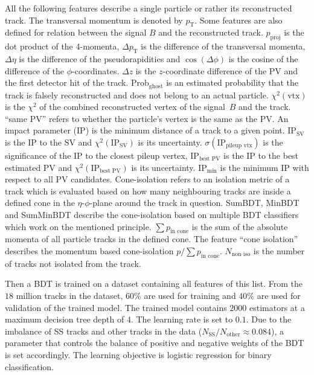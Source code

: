 All the following features describe a single particle or rather its reconstructed track.
%
The transversal momentum is denoted by $p_\text{T}$. 
%
Some features are also defined for relation between the signal $B$ and the reconstructed track. 
$p_\text{proj}$ is the dot product of the 4-momenta,
$\Delta p_\text{T}$ is the difference of the transversal momenta,    
$\Delta \eta$ is the difference of the pseudorapidities and   
$\cos(\Delta \phi)$ is the cosine of the difference of the $\phi$-coordinates. 
$\Delta z$ is the $z$-coordinate difference of the PV and the first detector hit of the track. 
%  
$\text{Prob}_\text{ghost}$ is an estimated probability that the track is falsely reconstructed and does not belong to an actual particle. 
$\chi^2(\text{vtx})$ is the $\chi^2$ of the combined reconstructed vertex of the signal~$B$ and the track. 
\enquote{same PV} refers to whether the particle's vertex is the same as the PV.
%
An impact parameter (IP) is the minimum distance of a track to a given point.
$\text{IP}_\text{SV}$ is the IP to the SV and  
$\chi^2(\text{IP}_\text{SV})$ is its uncertainty.
$\sigma(\text{IP}_\text{pileup vtx})$ is the significance of the IP to the closest pileup vertex,
$\text{IP}_\text{best PV}$ is the IP to the best estimated PV and  
$\chi^2(\text{IP}_\text{best PV})$ is its uncertainty.
$\text{IP}_\text{min}$ is the minimum IP with respect to all PV candidates.
%
Cone-isolation refers to an isolation metric of a track which is evaluated based on how many neighbouring tracks are inside a defined cone in the $\eta$-$\phi$-plane around the track in question.
SumBDT,    
MinBDT and    
SumMinBDT describe the cone-isolation based on multiple BDT classifiers which work on the mentioned principle.
$\sum p_\text{in cone}$ is the sum of the absolute momenta of all particle tracks in the defined cone.
The feature \enquote{cone isolation} describes the momentum based cone-isolation $p/\sum p_\text{in cone}$. 
$N_\text{non iso}$ is the number of tracks not isolated from the track.   

Then a BDT is trained on a dataset containing all features of this list.
From the $18$ million tracks in the dataset, $60\%$ are used for training and $40\%$ are used for validation of the trained model.
The trained model contains $2000$ estimators at a maximum decision tree depth of $4$.
The learning rate is set to $0.1$.
Due to the imbalance of SS tracks and other tracks in the data ($N_\text{SS}/N_\text{other} \approx 0.084$), a parameter that controls the balance of positive and negative weights of the BDT is set accordingly. 
The learning objective is logistic regression for binary classification.

